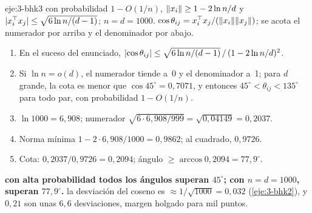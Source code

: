 \begin{solucion}{eje:3-bhk3}
\datos con probabilidad $1-O(1/n)$, $\lVert x_i\rVert\ge 1-2\ln n/d$ y $\lvert x_i^{\top} x_j\rvert\le\sqrt{6\ln n/(d-1)}$; $n=d=1000$.
\planteamiento $\cos\theta_{ij}=x_i^{\top} x_j/(\lVert x_i\rVert\lVert x_j\rVert)$; se acota el numerador por arriba y el denominador por abajo.
\pasos
\begin{enumerate}[label=\arabic*.]
  \item En el suceso del enunciado, $\lvert\cos\theta_{ij}\rvert\le\sqrt{6\ln n/(d-1)}\,/\,(1-2\ln n/d)^{2}$.
  \item Si $\ln n=o(d)$, el numerador tiende a~0 y el denominador a~1; para $d$ grande, la cota es menor que $\cos 45^\circ=0{,}7071$, y entonces $45^\circ<\theta_{ij}<135^\circ$ para todo par, con probabilidad $1-O(1/n)$.
  \item $\ln 1000=6{,}908$; numerador $\sqrt{6\cdot 6{,}908/999}=\sqrt{0{,}04149}=0{,}2037$.
  \item Norma mínima $1-2\cdot 6{,}908/1000=0{,}9862$; al cuadrado, $0{,}9726$.
  \item Cota: $0{,}2037/0{,}9726=0{,}2094$; ángulo $\ge\arccos 0{,}2094=77{,}9^\circ$.
\end{enumerate}
\resultado \textbf{con alta probabilidad todos los ángulos superan $45^\circ$; con $n=d=1000$, superan $77{,}9^\circ$.}
\comprobacion la desviación del coseno es $\approx 1/\sqrt{1000}=0{,}032$ (\cref{eje:3-bhk2}), y $0{,}21$ son unas $6{,}6$ desviaciones, margen holgado para mil puntos.
\end{solucion}

